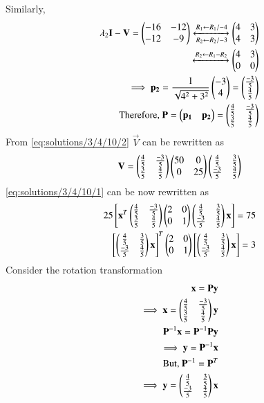 Similarly,
\begin{align}
  \lambda_2\mathbf{I}-\mathbf{V}= \begin{pmatrix}-16&-12\\-12&-9\end{pmatrix}\xleftrightarrow[R_2\leftarrow R_2/-3]{R_1\leftarrow R_1/-4}\begin{pmatrix}4&3\\4&3\end{pmatrix}\\
\xleftrightarrow[]{R_2\leftarrow R_1-R_2}\begin{pmatrix}4&3\\0&0\end{pmatrix}\\
\implies \mathbf{p_2}=\frac{1}{\sqrt{4^2+3^2}}\begin{pmatrix}-3\\4\end{pmatrix}=\begin{pmatrix}\frac{-3}{5}\\\frac{4}{5}\end{pmatrix}\\\text{ Therefore, } \mathbf{P}=\begin{pmatrix}\mathbf{p_1}&\mathbf{p_2}\end{pmatrix}=\begin{pmatrix}\frac{4}{5}&\frac{-3}{5}\\ \frac{3}{5}&\frac{4}{5}\end{pmatrix}
\end{align}
From \eqref{eq:solutions/3/4/10/2} $\vec{V}$ can be rewritten as
\begin{align}
    \mathbf{V}=\begin{pmatrix}\frac{4}{5}&\frac{-3}{5}\\ \frac{3}{5}&\frac{4}{5}\end{pmatrix}\begin{pmatrix}50&0\\0&25\end{pmatrix}\begin{pmatrix}\frac{4}{5}&\frac{3}{5}\\ \frac{-3}{5}&\frac{4}{5}\end{pmatrix}
\end{align}
\eqref{eq:solutions/3/4/10/1} can be now rewritten as
\begin{align}
25\left[\mathbf{x}^T\begin{pmatrix}\frac{4}{5}&\frac{-3}{5}\\ \frac{3}{5}&\frac{4}{5}\end{pmatrix}\begin{pmatrix}2&0\\0&1\end{pmatrix}\begin{pmatrix}\frac{4}{5}&\frac{3}{5}\\ \frac{-3}{5}&\frac{4}{5}\end{pmatrix}\mathbf{x}\right]=75\\
  \left[\begin{pmatrix}\frac{4}{5}&\frac{3}{5}\\ \frac{-3}{5}&\frac{4}{5}\end{pmatrix}\mathbf{x}\right]^T\begin{pmatrix}2&0\\0&1\end{pmatrix}\left[\begin{pmatrix}\frac{4}{5}&\frac{3}{5}\\ \frac{-3}{5}&\frac{4}{5}\end{pmatrix}\mathbf{x}\right]= 3\label{eq:solutions/3/4/10/3}
\end{align}
 Consider the rotation transformation 
\begin{align}
  \mathbf{x}=\mathbf{P}\mathbf{y}\\
  \implies \mathbf{x}=\begin{pmatrix}\frac{4}{5}&\frac{-3}{5}\\ \frac{3}{5}&\frac{4}{5}\end{pmatrix}\mathbf{y}\label{eq:solutions/3/4/10/4}\\
  \mathbf{P}^{-1}\mathbf{x}=\mathbf{P}^{-1}\mathbf{P}\mathbf{y}\\
  \implies \mathbf{y}= \mathbf{P}^{-1}\mathbf{x}\\
  \text{But, }\mathbf{P}^{-1}=\mathbf{P}^T\\
  \implies \mathbf{y}=\begin{pmatrix}\frac{4}{5}&\frac{3}{5}\\ \frac{-3}{5}&\frac{4}{5}\end{pmatrix}\mathbf{x}
\end{align}


